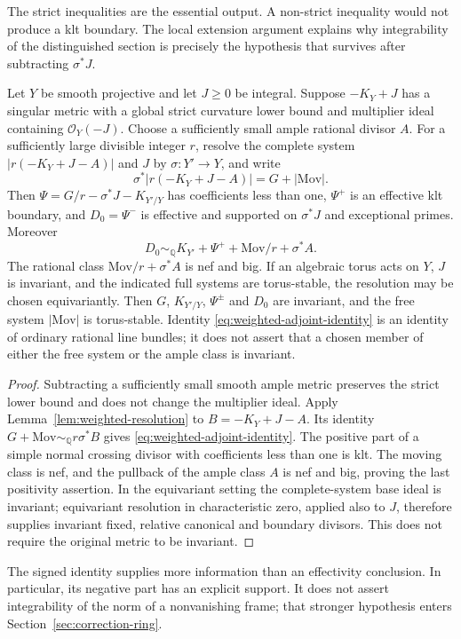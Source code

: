 The strict inequalities are the essential output.  A non-strict
inequality would not produce a klt boundary.  The local extension
argument explains why integrability of the distinguished section is
precisely the hypothesis that survives after subtracting $\sigma^*J$.

\begin{theorem}
\label{thm:weighted-approximation}
Let $Y$ be smooth projective and let $J\ge0$ be integral.  Suppose
$-K_Y+J$ has a singular metric with a global strict curvature lower
bound and multiplier ideal containing $\mathcal O_Y(-J)$.
Choose a sufficiently small ample rational divisor $A$.
For a sufficiently large divisible integer $r$, resolve the complete
system $|r(-K_Y+J-A)|$ and $J$ by $\sigma:Y'\to Y$, and write
\[
 \sigma^*|r(-K_Y+J-A)|=G+|\mathrm{Mov}|.
\]
Then $\Psi=G/r-\sigma^*J-K_{Y'/Y}$ has coefficients less than one,
$\Psi^+$ is an effective klt boundary, and
$D_0=\Psi^-$ is effective and supported on $\sigma^*J$ and exceptional
primes.  Moreover
\begin{equation}\label{eq:weighted-adjoint-identity}
 D_0\sim_{\mathbb Q}
 K_{Y'}+\Psi^++\mathrm{Mov}/r+\sigma^*A.
\end{equation}
The rational class $\mathrm{Mov}/r+\sigma^*A$ is nef and big.
If an algebraic torus acts on $Y$, $J$ is invariant, and the indicated
full systems are torus-stable, the resolution may be chosen equivariantly.  Then $G$,
$K_{Y'/Y}$, $\Psi^\pm$ and $D_0$ are invariant, and the free
system $|\mathrm{Mov}|$ is torus-stable.  Identity
\eqref{eq:weighted-adjoint-identity} is an identity of ordinary rational
line bundles; it does not assert that a chosen member of either the
free system or the ample class is invariant.
\end{theorem}

\begin{proof}
Subtracting a sufficiently small smooth ample metric preserves the
strict lower bound and does not change the multiplier ideal.
Apply Lemma~\ref{lem:weighted-resolution} to $B=-K_Y+J-A$.
Its identity $G+\mathrm{Mov}\sim_{\mathbb Q}r\sigma^*B$ gives
\eqref{eq:weighted-adjoint-identity}.  The positive part of a simple
normal crossing divisor with coefficients less than one is klt.
The moving class is nef, and the pullback of the ample class $A$ is
nef and big, proving the last positivity assertion.
In the equivariant setting the complete-system base ideal is invariant;
equivariant resolution in characteristic zero, applied also to $J$,
therefore supplies invariant fixed, relative canonical and boundary
divisors.  This does not require the original metric to be invariant.
\end{proof}

The signed identity supplies more information than an effectivity
conclusion.  In particular, its negative part has an explicit support.
It does not assert integrability of the norm of a nonvanishing frame;
that stronger hypothesis enters Section~\ref{sec:correction-ring}.
